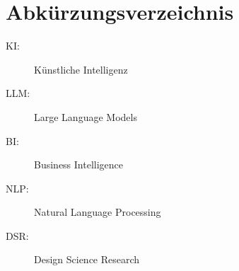 

\section *{Abkürzungsverzeichnis} %
\begin{description}
\item[KI:] Künstliche Intelligenz
\item[LLM:] Large Language Models
\item[BI:] Business Intelligence
\item[NLP:] Natural Language Processing
\item[DSR:] Design Science Research
\end{description}
